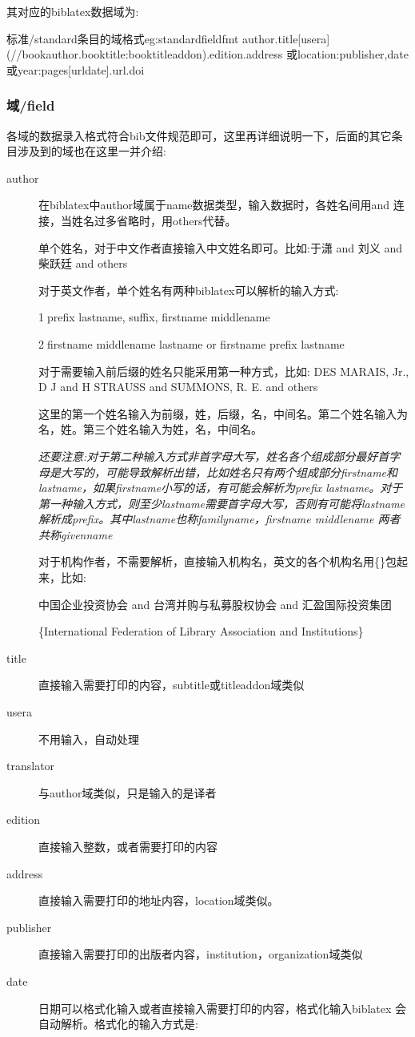 其对应的biblatex数据域为:
\begin{codetex}{标准/standard条目的域格式}{eg:standardfieldfmt}
author.title[usera](//bookauthor.booktitle:booktitleaddon).edition.address 或location:publisher,date或year:pages[urldate].url.doi
\end{codetex}


\subsubsection{域/field}\label{sec:field}
各域的数据录入格式符合bib文件规范即可，这里再详细说明一下，后面的其它条目涉及到的域也在这里一并介绍:
\begin{description}
  \item[author] 在biblatex中author域属于name数据类型，输入数据时，各姓名间用and 连接，当姓名过多省略时，用others代替。

      单个姓名，对于中文作者直接输入中文姓名即可。比如:于潇 and 刘义 and 柴跃廷 and others

      对于英文作者，单个姓名有两种biblatex可以解析的输入方式:

      \textcircled{1}prefix lastname, suffix, firstname middlename

      \textcircled{2}firstname middlename lastname or firstname prefix lastname

      对于需要输入前后缀的姓名只能采用第一种方式，比如:
      DES MARAIS, Jr., D J and H STRAUSS and SUMMONS, R. E. and others

      这里的第一个姓名输入为前缀，姓，后缀，名，中间名。第二个姓名输入为名，姓。第三个姓名输入为姓，名，中间名。

      \emph{还要注意:对于第二种输入方式非首字母大写，姓名各个组成部分最好首字母是大写的，可能导致解析出错，比如姓名只有两个组成部分firstname和lastname，如果firstname小写的话，有可能会解析为prefix lastname。对于第一种输入方式，则至少lastname需要首字母大写，否则有可能将lastname解析成prefix。其中lastname也称familyname，firstname middlename 两者共称givenname}

      对于机构作者，不需要解析，直接输入机构名，英文的各个机构名用\{\}包起来，比如:

      中国企业投资协会 and 台湾并购与私募股权协会 and 汇盈国际投资集团

      \{International Federation of Library Association and Institutions\}

  \item[title] 直接输入需要打印的内容，subtitle或titleaddon域类似
  \item[usera] 不用输入，自动处理
  \item[translator] 与author域类似，只是输入的是译者
  \item[edition] 直接输入整数，或者需要打印的内容
  \item[address] 直接输入需要打印的地址内容，location域类似。
  \item[publisher] 直接输入需要打印的出版者内容，institution，organization域类似
  \item[date] 日期可以格式化输入或者直接输入需要打印的内容，格式化输入biblatex 会自动解析。格式化的输入方式是:


\end{description}
